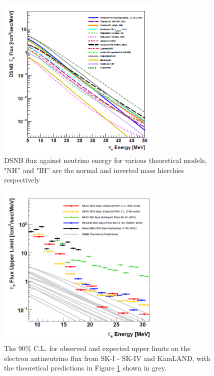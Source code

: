 \begin{figure}
    \centering
    \includegraphics[width=0.7\textwidth]{Figures/DSNB_energy.png}
    \caption{DSNB flux against neutrino energy for various theoretical models, "NH'' and "IH'' are the normal and inverted mass hierchies respectively}
    \label{fig:DSNBenergy}
\end{figure}

\begin{figure}
    \centering
    \includegraphics[width=0.7\textwidth]{Figures/DSNBlimit.png}
    \caption{The 90\% C.L. for observed and expected upper limits on the electron antineutrino flux from SK-I - SK-IV and KamLAND, with the theoretical predictions in Figure \ref{fig:DSNBenergy} shown in grey.}
    \label{fig:DSNBlimit}
\end{figure}


